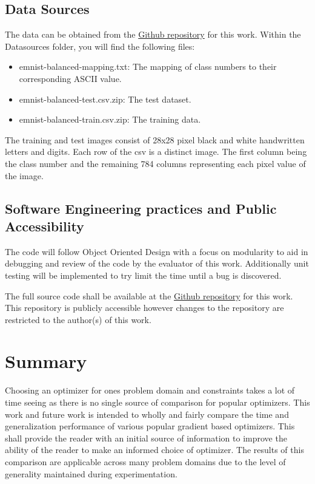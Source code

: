 \documentclass{article}
\begin{document}
\subsection{Data Sources}
The data can be obtained from the \href{https://github.com/KenanKarav/CapstoneProject.git}{Github repository} for this work. Within the Datasources folder, you will find the following files:
\begin{itemize}
	\item emnist-balanced-mapping.txt: The mapping of class numbers to their corresponding ASCII value.
	\item emnist-balanced-test.csv.zip: The test dataset.
	\item emnist-balanced-train.csv.zip: The training data.
\end{itemize}
The training and test images consist of 28x28 pixel black and white handwritten letters and digits. Each row of the csv is a distinct image. The first column being the class number and the remaining 784 columns representing each pixel value of the image.

\subsection{Software Engineering practices and Public Accessibility}
The code will follow Object Oriented Design with a focus on modularity to aid in debugging and review of the code by the evaluator of this work. Additionally unit testing will be implemented to try limit the time until a bug is discovered. 

The full source code shall be available at the \href{https://github.com/KenanKarav/CapstoneProject.git}{Github repository} for this work. This repository is publicly accessible however changes to the repository are restricted to the author(s) of this work.
\section{Summary}

Choosing an optimizer for ones problem domain and constraints takes a lot of time seeing as there is no single source of comparison for popular optimizers. This work and future work is intended to wholly and fairly compare the time and generalization performance of various popular gradient based optimizers. This shall provide the reader with an initial source of information to improve the ability of the reader to make an informed choice of optimizer. The results of this comparison are applicable across many problem domains due to the level of generality maintained during experimentation. 
\end{document}
